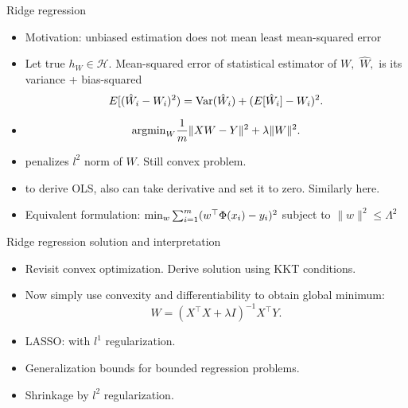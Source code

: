 \documentclass[final]{beamer}
\begin{document}
\begin{frame}{Ridge regression}
	\begin{itemize}
		\item Motivation: unbiased estimation does not mean least mean-squared error
		\pause
	\item Let true $h_W \in \mathcal{H}.$ Mean-squared error of statistical estimator of $W,$ $\hat{W},$ is its variance + bias-squared
		$$E[(\hat{W}_i - W_i)^2) = {\rm Var}(\hat{W}_i) + (E[\hat{W}_i] - W_i)^2.$$
		\item 
	$$ {\rm arg min}_{W} \dfrac{1}{m} \|X W - Y\|^2 + \lambda \|W\|^2.$$
		\pause
	\item penalizes $l^2$ norm of $W$. Still convex problem.
	\pause 
	\item to derive OLS, also can take derivative and set it to zero. Similarly here.
	\pause
\item Equivalent formulation:
	$ {\rm min}_w \sum_{i=1}^m (w^\top \Phi(x_i) - y_i)^2$ subject to $\|w\|^2 \leq \Lambda^2$
	\end{itemize}
\end{frame}
\begin{frame}{Ridge regression solution and interpretation}
	\begin{itemize}
		\item Revisit convex optimization. Derive solution using KKT conditions.
		\pause
		\item Now simply use convexity and differentiability to obtain global minimum:
			$$W = (X^\top X + \lambda I)^{-1} X^\top Y.$$ 
		\pause
		\item LASSO: with $l^1$ regularization.
		\pause
		\item Generalization bounds for bounded regression problems.
		\pause 
	\item Shrinkage by $l^2$ regularization.
	\end{itemize}

\end{frame}
\end{document}
